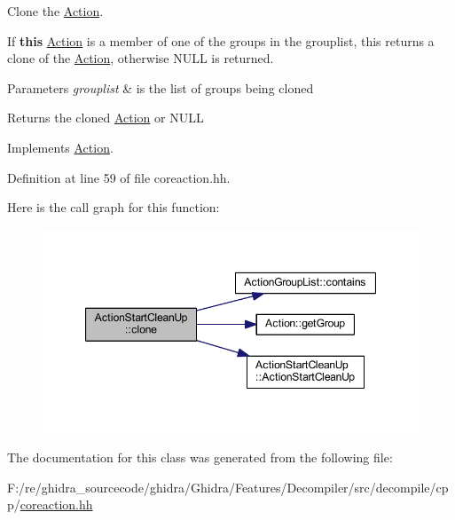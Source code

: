 Clone the \mbox{\hyperlink{class_action}{Action}}. 

If {\bfseries{this}} \mbox{\hyperlink{class_action}{Action}} is a member of one of the groups in the grouplist, this returns a clone of the \mbox{\hyperlink{class_action}{Action}}, otherwise N\+U\+LL is returned. 
\begin{DoxyParams}{Parameters}
{\em grouplist} & is the list of groups being cloned \\
\hline
\end{DoxyParams}
\begin{DoxyReturn}{Returns}
the cloned \mbox{\hyperlink{class_action}{Action}} or N\+U\+LL 
\end{DoxyReturn}


Implements \mbox{\hyperlink{class_action_af8242e41d09e5df52f97df9e65cc626f}{Action}}.



Definition at line 59 of file coreaction.\+hh.

Here is the call graph for this function\+:
\nopagebreak
\begin{figure}[H]
\begin{center}
\leavevmode
\includegraphics[width=347pt]{class_action_start_clean_up_ad9e7b95a0ee1607e600fad95f78fff93_cgraph}
\end{center}
\end{figure}


The documentation for this class was generated from the following file\+:\begin{DoxyCompactItemize}
\item 
F\+:/re/ghidra\+\_\+sourcecode/ghidra/\+Ghidra/\+Features/\+Decompiler/src/decompile/cpp/\mbox{\hyperlink{coreaction_8hh}{coreaction.\+hh}}\end{DoxyCompactItemize}
